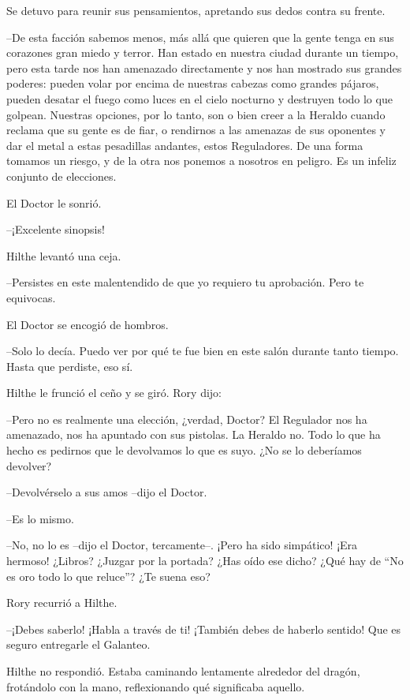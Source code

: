 {Se detuvo para reunir sus pensamientos, apretando sus dedos contra su
frente.}

{--De esta facción sabemos menos, más allá que quieren que la gente
	tenga en sus corazones gran miedo y terror. Han estado en nuestra ciudad
	durante un tiempo, pero esta tarde nos han amenazado directamente y nos
	han mostrado sus grandes poderes: pueden volar por encima de nuestras
	cabezas como grandes pájaros, pueden desatar el fuego como luces en el
	cielo nocturno y destruyen todo lo que golpean. Nuestras opciones, por
	lo tanto, son o bien creer a la Heraldo cuando reclama que su gente es
	de fiar, o rendirnos a las amenazas de sus oponentes y dar el metal a
	estas pesadillas andantes, estos Reguladores. De una forma tomamos un
	riesgo, y de la otra nos ponemos a nosotros en peligro. Es un infeliz
conjunto de elecciones.}

{El Doctor le sonrió.}

{--¡Excelente sinopsis!}

{Hilthe levantó una ceja.}

{--Persistes en este malentendido de que yo requiero tu aprobación.
Pero te equivocas.}

{El Doctor se encogió de hombros.}

{--Solo lo decía. Puedo ver por qué te fue bien en este salón durante
tanto tiempo. Hasta que perdiste, eso sí.}

{Hilthe le frunció el ceño y se giró. Rory dijo:}

{--Pero no es realmente una elección, ¿verdad, Doctor? El Regulador
	nos ha amenazado, nos ha apuntado con sus pistolas. La Heraldo no. Todo
	lo que ha hecho es pedirnos que le devolvamos lo que es suyo. ¿No se lo
deberíamos devolver?}

{--Devolvérselo a sus amos --dijo el Doctor.}

{--Es lo mismo.}

{--No, no lo es --dijo el Doctor, tercamente--. ¡Pero ha sido
	simpático! ¡Era hermoso! ¿Libros? ¿Juzgar por la portada? ¿Has oído ese
dicho? ¿Qué hay de ``No es oro todo lo que reluce''? ¿Te suena eso?}

{Rory recurrió a Hilthe.}

{--¡Debes saberlo! ¡Habla a través de ti! ¡También debes de haberlo
sentido! Que es seguro entregarle el Galanteo.}

{Hilthe no respondió. Estaba caminando lentamente alrededor del dragón,
frotándolo con la mano, reflexionando qué significaba aquello.}

